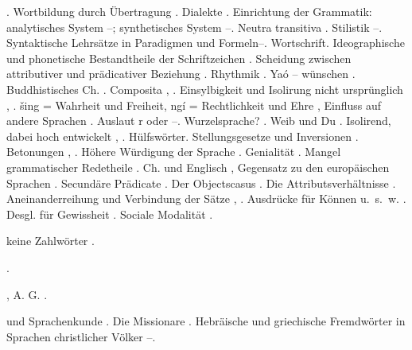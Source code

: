 \begin{register}
. Wortbildung durch Übertragung \pageref{sp.42}. Dialekte \pageref{sp.58}. Einrichtung der Grammatik: analytisches System \pageref{sp.90}–\pageref{sp.92}; synthetisches System \pageref{sp.101}–\pageref{sp.104}.  Neutra transitiva \pageref{sp.102}. Stilistik \pageref{sp.105}–\pageref{sp.106}. Syntaktische Lehrsätze in Paradigmen und Formeln\pageref{sp.114}–\pageref{sp.118}. Wortschrift\pageref{sp.128}. Ideographische und phonetische Bestandtheile der Schriftzeichen \pageref{sp.129}. Scheidung zwischen attributiver und prädicativer Beziehung \pageref{sp.151}.  Rhythmik \pageref{sp.197}. Yaó – wünschen \pageref{sp.222}. Buddhistisches Ch. \pageref{sp.231}. Composita \pageref{sp.242}, \pageref{sp.243}.  Einsylbigkeit und Isolirung nicht ursprünglich \pageref{sp.255}, \pageref{sp.257}. šing = Wahrheit und Freiheit, ngí = Rechtlichkeit und Ehre \pageref{sp.265}, Einfluss auf andere Sprachen \pageref{sp.271}. Auslaut r oder \pageref{sp.1} \pageref{sp.290}–\pageref{sp.291}. Wurzelsprache? \pageref{sp.296}. Weib und Du \pageref{sp.306}.  Isolirend, dabei hoch entwickelt \pageref{sp.346}, \pageref{sp.362}.  Hülfswörter\pageref{sp.347}. Stellungsgesetze und Inversionen \pageref{sp.372}. Betonungen \pageref{sp.377}, \pageref{sp.379}. Höhere Würdigung der Sprache \pageref{sp.389}. Genialität \pageref{sp.399}. Mangel grammatischer Redetheile \pageref{sp.440}. Ch. und Englisch \pageref{sp.440}, Gegensatz zu den europäischen Sprachen \pageref{sp.447}. Secundäre Prädicate \pageref{sp.459}. Der Objectscasus \pageref{sp.461}. Die Attributsverhältnisse \pageref{sp.462}. Aneinanderreihung und Verbindung der Sätze \pageref{sp.465}, \pageref{sp.469}. Ausdrücke für Können u.~s.~w. \pageref{sp.471}. Desgl. für Gewissheit \pageref{sp.471}. Sociale Modalität \pageref{sp.474}.

   keine Zahlwörter \pageref{sp.152}. 

 \pageref{sp.358}.


, A. G. \pageref{sp.379}.

 und Sprachenkunde \pageref{sp.21}. Die Missionare \pageref{sp.25}. Hebräische und griechische Fremdwörter in Sprachen christlicher Völker \pageref{sp.230}–\pageref{sp.231}.


\end{register}
